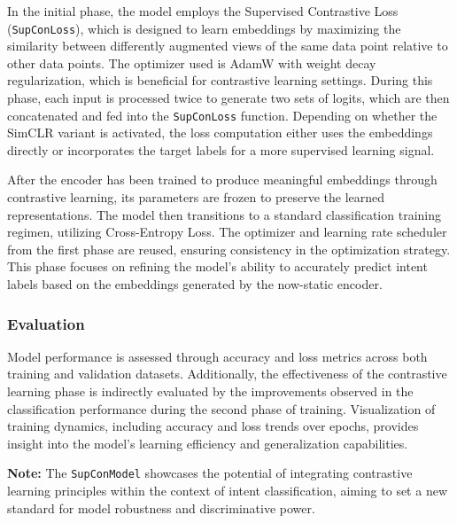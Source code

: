 In the initial phase, the model employs the Supervised Contrastive Loss (\texttt{SupConLoss}), which is designed to learn embeddings by maximizing the similarity between differently augmented views of the same data point relative to other data points. The optimizer used is AdamW with weight decay regularization, which is beneficial for contrastive learning settings. During this phase, each input is processed twice to generate two sets of logits, which are then concatenated and fed into the \texttt{SupConLoss} function. Depending on whether the SimCLR variant is activated, the loss computation either uses the embeddings directly or incorporates the target labels for a more supervised learning signal.

After the encoder has been trained to produce meaningful embeddings through contrastive learning, its parameters are frozen to preserve the learned representations. The model then transitions to a standard classification training regimen, utilizing Cross-Entropy Loss. The optimizer and learning rate scheduler from the first phase are reused, ensuring consistency in the optimization strategy. This phase focuses on refining the model's ability to accurately predict intent labels based on the embeddings generated by the now-static encoder.

\subsubsection*{Evaluation}
Model performance is assessed through accuracy and loss metrics across both training and validation datasets. Additionally, the effectiveness of the contrastive learning phase is indirectly evaluated by the improvements observed in the classification performance during the second phase of training. Visualization of training dynamics, including accuracy and loss trends over epochs, provides insight into the model's learning efficiency and generalization capabilities.

\textbf{Note:} The \texttt{SupConModel} showcases the potential of integrating contrastive learning principles within the context of intent classification, aiming to set a new standard for model robustness and discriminative power.

